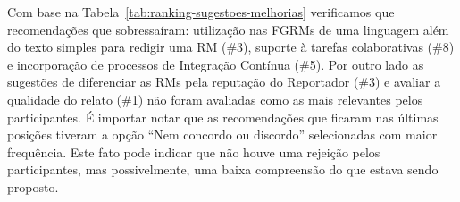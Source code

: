 \begin{table}[htpb]
\centering
{}
\caption{Pesos utilizados para ordenar as sugestões propostas.}
\label{tab:pesos_rank_sug_melhorias}
\end{table}

Com base na Tabela~\ref{tab:ranking-sugestoes-melhorias} verificamos que
recomendações que sobressaíram: utilização nas FGRMs de uma linguagem além do
texto simples para redigir uma RM (\#3), suporte à tarefas colaborativas (\#8) e
incorporação de processos de Integração Contínua (\#5). Por outro lado as
sugestões de diferenciar as RMs pela reputação do Reportador (\#3) e avaliar a
qualidade do relato (\#1) não foram avaliadas como as mais relevantes pelos
participantes. É importar notar que as recomendações que ficaram nas últimas
posições tiveram a opção ``Nem concordo ou discordo'' selecionadas com maior
frequência. Este fato pode indicar que não houve uma rejeição pelos
participantes, mas possivelmente, uma baixa compreensão do que estava sendo
proposto.

\begin{table}[htpb]
\centering
{}
\caption{Ranking das sugestões propostas}
\label{tab:ranking-sugestoes-melhorias}
\end{table}

